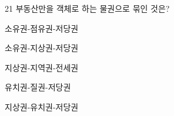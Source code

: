 \begin{question}{21}
부동산만을 객체로 하는 물권으로 묶인 것은?
\begin{choices}
  \item 소유권-점유권-저당권
  \item 소유권-지상권-저당권
  \item 지상권-지역권-전세권
  \item 유치권-질권-저당권
  \item 지상권-유치권-저당권
\end{choices}
\end{question}
